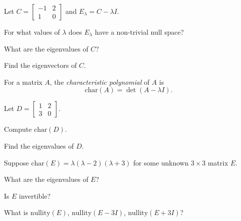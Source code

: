\documentclass{problemset}
\newcommand{\nnul}{\mathrm{nullity}}
\newcommand{\mat}[1]{\begin{bmatrix}#1\end{bmatrix}}
\newcommand{\chr}{\mathrm{char}}
\begin{document}
	\vspace{-.2cm}
	\question
	Let $C=\mat{-1&2\\1&0}$ and $E_\lambda = C-\lambda I$.
	\begin{parts}
		\item For what values of $\lambda$ does $E_\lambda$ have a non-trivial
			null space?
		\item What are the eigenvalues of $C$?
		\item Find the eigenvectors of $C$.
	\end{parts}
	
	\begin{definition}
	For a matrix $A$, the \emph{characteristic polynomial} of $A$ is
	\[
		\chr(A)=\det(A-\lambda I).
	\]
	\end{definition}
	\vspace{-.4cm}
	
	\question
	Let $D=\mat{1&2\\3&0}$.
	\begin{parts}
		\item Compute $\chr(D)$.
		\item Find the eigenvalues of $D$.
	\end{parts}

	\vspace{-.3cm}
	\question
	\vspace{-.2cm}
	Suppose $\chr(E)=\lambda(\lambda -2)(\lambda +3)$ for some unknown $3\times 3$
	matrix $E$.
	\begin{parts}
		\item What are the eigenvalues of $E$?
		\item Is $E$ invertible?
		\item What is $\nnul(E)$, $\nnul(E-3I)$, $\nnul(E+3I)$?
	\end{parts}
\end{document}
